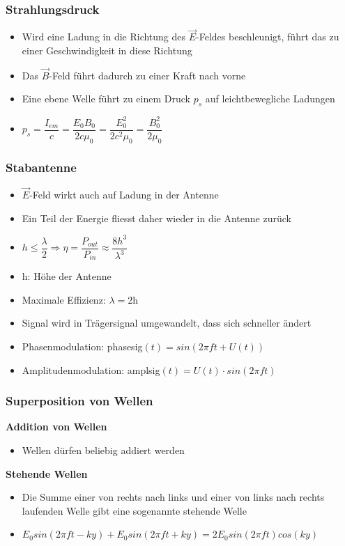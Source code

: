 \documentclass[8pt,a4paper]{scrartcl}
\begin{document}
\begin{multicols*}{3}
					\subsubsection{Strahlungsdruck}
						\begin{itemize}\itemsep0pt
							\item Wird eine Ladung in die Richtung des $\overrightarrow{E}$-Feldes beschleunigt, führt das zu einer Geschwindigkeit in diese Richtung
							\item Das $\overrightarrow{B}$-Feld führt dadurch zu einer Kraft nach vorne
							\item Eine ebene Welle führt zu einem Druck $p_{s}$ auf leichtbewegliche Ladungen
							\item $p_{s}=\dfrac{I_{em}}{c}= \dfrac{E_{0}B_{0}}{2c\mu_{0}}=\dfrac{E_{0}^{2}}{2c^{2}\mu_{0}} = \dfrac{B_{0}^{2}}{2\mu_{0}}$
						\end{itemize}	
						
					
					\subsubsection{Stabantenne}
						\begin{itemize}\itemsep0pt
							\item $\overrightarrow{E}$-Feld wirkt auch auf Ladung in der Antenne
							\item Ein Teil der Energie fliesst daher wieder in die Antenne zurück
							\item $h \leq \dfrac{\lambda}{2} \Rightarrow \eta = \dfrac{P_{out}}{P_{in}}\approx \dfrac{8h^{3}}{\lambda^{3}}$
							\item h: Höhe der Antenne
							\item Maximale Effizienz: $\lambda = 2$h
							\item Signal wird in Trägersignal umgewandelt, dass sich schneller ändert
							\item Phasenmodulation: phasesig$(t) = sin(2\pi f t + U(t))$
							\item Amplitudenmodulation: amplsig$(t)=U(t) \cdot sin(2\pi ft)$
						\end{itemize}	
					\subsubsection{Superposition von Wellen}
						\textbf{Addition von Wellen}
						\begin{itemize}\itemsep0pt
							\item Wellen dürfen beliebig addiert werden
						\end{itemize}	
						\textbf{Stehende Wellen}
						\begin{itemize}\itemsep0pt
							\item Die Summe einer von rechts nach links und einer von links nach rechts laufenden Welle gibt eine sogenannte stehende Welle
							\item $E_{0} sin(2\pi ft - ky)+E_{0} sin(2\pi ft+ky)=2E_{0} sin(2\pi ft)cos(ky)$
						\end{itemize}	
						

\end{multicols*}
\end{document}
